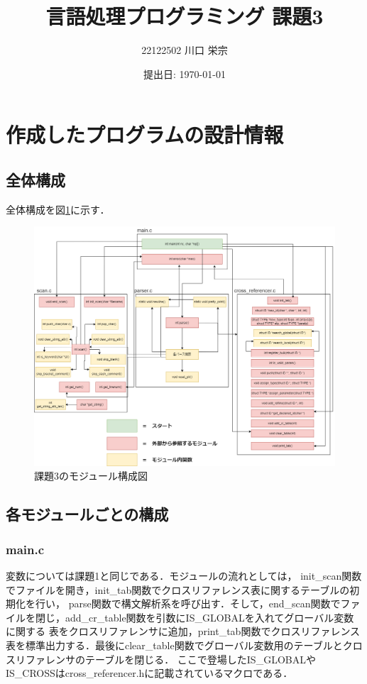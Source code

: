 \documentclass{jlreq}
\title{言語処理プログラミング 課題3}
\author{22122502 川口 栄宗}
\date{提出日: \today}
\begin{document}
\maketitle
\clearpage

\section{作成したプログラムの設計情報}

\subsection{全体構成}

全体構成を図\ref{fig:module_graph}に示す．
\begin{figure}[H]
  \centering
  \includegraphics[width=\textwidth]{assets/lpp03_module.png}
  \caption{課題3のモジュール構成図}
  \label{fig:module_graph}
\end{figure}

\subsection{各モジュールごとの構成}

\subsubsection{main.c}
変数については課題1と同じである．モジュールの流れとしては，
init\_scan関数でファイルを開き，init\_tab関数でクロスリファレンス表に関するテーブルの初期化を行い，
parse関数で構文解析系を呼び出す．そして，end\_scan関数でファイルを閉じ，add\_cr\_table関数を引数にIS\_GLOBALを入れてグローバル変数に関する
表をクロスリファレンサに追加，print\_tab関数でクロスリファレンス表を標準出力する．最後にclear\_table関数でグローバル変数用のテーブルとクロスリファレンサのテーブルを閉じる．
ここで登場したIS\_GLOBALやIS\_CROSSはcross\_referencer.hに記載されているマクロである．
\end{document}
